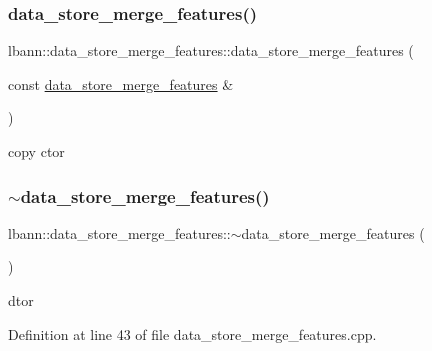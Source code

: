 \subsubsection{\texorpdfstring{data\+\_\+store\+\_\+merge\+\_\+features()}{data\_store\_merge\_features()}\hspace{0.1cm}{\footnotesize\ttfamily [2/2]}}
{\footnotesize\ttfamily lbann\+::data\+\_\+store\+\_\+merge\+\_\+features\+::data\+\_\+store\+\_\+merge\+\_\+features (\begin{DoxyParamCaption}\item[{const \hyperlink{classlbann_1_1data__store__merge__features}{data\+\_\+store\+\_\+merge\+\_\+features} \&}]{ }\end{DoxyParamCaption})\hspace{0.3cm}{\ttfamily [default]}}



copy ctor 

\mbox{\label{classlbann_1_1data__store__merge__features_ade3b7b138376880121d16f40255e5f54}} 
\subsubsection{\texorpdfstring{$\sim$data\+\_\+store\+\_\+merge\+\_\+features()}{~data\_store\_merge\_features()}}
{\footnotesize\ttfamily lbann\+::data\+\_\+store\+\_\+merge\+\_\+features\+::$\sim$data\+\_\+store\+\_\+merge\+\_\+features (\begin{DoxyParamCaption}{ }\end{DoxyParamCaption})\hspace{0.3cm}{\ttfamily [override]}}



dtor 



Definition at line 43 of file data\+\_\+store\+\_\+merge\+\_\+features.\+cpp.


